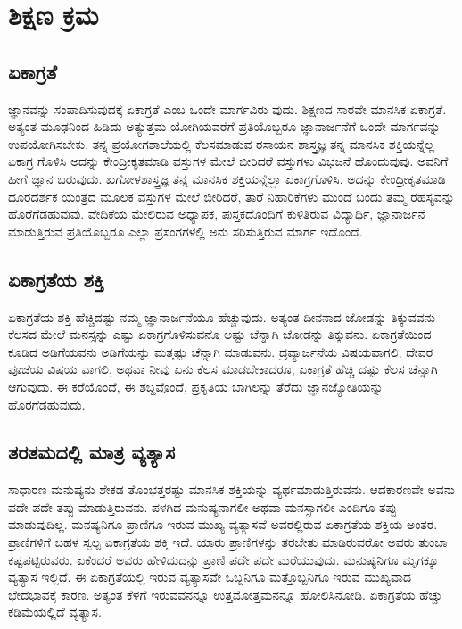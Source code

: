 
\chapter{ಶಿಕ್ಷಣ ಕ್ರಮ}

\section{ಏಕಾಗ್ರತೆ}

ಜ್ಞಾನವನ್ನು ಸಂಪಾದಿಸುವುದಕ್ಕೆ ಏಕಾಗ್ರತೆ ಎಂಬ ಒಂದೇ ಮಾರ್ಗವಿರು ವುದು. ಶಿಕ್ಷಣದ ಸಾರವೇ ಮಾನಸಿಕ ಏಕಾಗ್ರತೆ. ಅತ್ಯಂತ ಮೂಢನಿಂದ ಹಿಡಿದು ಅತ್ಯುತ್ತಮ ಯೋಗಿಯವರೆಗೆ ಪ್ರತಿಯೊಬ್ಬರೂ ಜ್ಞಾನಾರ್ಜನೆಗೆ ಒಂದೇ ಮಾರ್ಗವನ್ನು ಉಪಯೋಗಿಸಬೇಕು. ತನ್ನ ಪ್ರಯೋಗಶಾಲೆಯಲ್ಲಿ ಕೆಲಸಮಾಡುವ ರಸಾಯನ ಶಾಸ್ತ್ರಜ್ಞ ತನ್ನ ಮಾನಸಿಕ ಶಕ್ತಿಯನ್ನೆಲ್ಲ ಏಕಾಗ್ರ ಗೊಳಿಸಿ ಅದನ್ನು ಕೇಂದ್ರೀಕೃತಮಾಡಿ ವಸ್ತುಗಳ ಮೇಲೆ ಬೀರಿದರೆ ವಸ್ತುಗಳು ವಿಭಜನೆ ಹೊಂದುವುವು. ಅವನಿಗೆ ಹೀಗೆ ಜ್ಞಾನ ಬರುವುದು. ಖಗೋಳಶಾಸ್ತ್ರಜ್ಞ ತನ್ನ ಮಾನಸಿಕ ಶಕ್ತಿಯನ್ನೆಲ್ಲಾ ಏಕಾಗ್ರಗೊಳಿಸಿ, ಅದನ್ನು ಕೇಂದ್ರೀಕೃತಮಾಡಿ ದೂರದರ್ಶಕ ಯಂತ್ರದ ಮೂಲಕ ವಸ್ತುಗಳ ಮೇಲೆ ಬೀರಿದರೆ, ತಾರೆ ನಿಹಾರಿಕೆಗಳು ಮುಂದೆ ಬಂದು ತಮ್ಮ ರಹಸ್ಯವನ್ನು ಹೊರೆಗೆಡಹುವುವು. ವೇದಿಕೆಯ ಮೇಲಿರುವ ಅಧ್ಯಾಪಕ, ಪುಸ್ತಕದೊಂದಿಗೆ ಕುಳಿತಿರುವ ವಿದ್ಯಾರ್ಥಿ, ಜ್ಞಾನಾರ್ಜನೆ ಮಾಡುತ್ತಿರುವ ಪ್ರತಿಯೊಬ್ಬರೂ ಎಲ್ಲಾ ಪ್ರಸಂಗಗಳಲ್ಲಿ ಅನು ಸರಿಸುತ್ತಿರುವ ಮಾರ್ಗ ಇದೊಂದೆ.


\section{ಏಕಾಗ್ರತೆಯ ಶಕ್ತಿ}

ಏಕಾಗ್ರತೆಯ ಶಕ್ತಿ ಹೆಚ್ಚಿದಷ್ಟು ನಮ್ಮ ಜ್ಞಾನಾರ್ಜನೆಯೂ ಹೆಚ್ಚುವುದು. ಅತ್ಯಂತ ದೀನನಾದ ಜೋಡನ್ನು ತಿಕ್ಕುವವನು ಕೆಲಸದ ಮೇಲೆ ಮನಸ್ಸನ್ನು ಎಷ್ಟು ಏಕಾಗ್ರಗೊಳಿಸುವನೊ ಅಷ್ಟು ಚೆನ್ನಾಗಿ ಜೋಡನ್ನು ತಿಕ್ಕುವನು. ಏಕಾಗ್ರತೆಯಿಂದ ಕೂಡಿದ ಅಡಿಗೆಯವನು ಅಡಿಗೆಯನ್ನು ಮತ್ತಷ್ಟು ಚೆನ್ನಾಗಿ ಮಾಡುವನು. ದ್ರವ್ಯಾರ್ಜನೆಯ ವಿಷಯವಾಗಲಿ, ದೇವರ ಪೂಜೆಯ ವಿಷಯ ವಾಗಲಿ, ಅಥವಾ ನೀವು ಏನು ಕೆಲಸ ಮಾಡಬೇಕಾದರೂ, ಏಕಾಗ್ರತೆ ಹೆಚ್ಚಿ ದಷ್ಟು ಕೆಲಸ ಚೆನ್ನಾಗಿ ಆಗುವುದು. ಈ ಕರೆಯೊಂದೆ, ಈ ಶಬ್ದವೊಂದೆ, ಪ್ರಕೃತಿಯ ಬಾಗಿಲನ್ನು ತೆರೆದು ಜ್ಞಾನಜ್ಯೋತಿಯನ್ನು ಹೊರಗೆಡಹುವುದು.


\section{ತರತಮದಲ್ಲಿ ಮಾತ್ರ ವ್ಯತ್ಯಾಸ}

ಸಾಧಾರಣ ಮನುಷ್ಯನು ಶೇಕಡ ತೊಂಭತ್ತರಷ್ಟು ಮಾನಸಿಕ ಶಕ್ತಿಯನ್ನು ವ್ಯರ್ಥಮಾಡುತ್ತಿರುವನು. ಆದಕಾರಣವೇ ಅವನು ಪದೇ ಪದೇ ತಪ್ಪು ಮಾಡುತ್ತಿರುವನು. ಪಳಗಿದ ಮನುಷ್ಯನಾಗಲೀ ಅಥವಾ ಮನಸ್ಸಾಗಲೀ ಎಂದಿಗೂ ತಪ್ಪು ಮಾಡುವುದಿಲ್ಲ. ಮನಷ್ಯನಿಗೂ ಪ್ರಾಣಿಗೂ ಇರುವ ಮುಖ್ಯ ವ್ಯತ್ಯಾಸವೆ ಅವರಲ್ಲಿರುವ ಏಕಾಗ್ರತೆಯ ಶಕ್ತಿಯ ಅಂತರ. ಪ್ರಾಣಿಗಳಿಗೆ ಬಹಳ ಸ್ವಲ್ಪ ಏಕಾಗ್ರತೆಯ ಶಕ್ತಿ ಇದೆ. ಯಾರು ಪ್ರಾಣಿಗಳನ್ನು ತರಬೇತು ಮಾಡಿರುವರೋ ಅವರು ತುಂಬಾ ಕಷ್ಟಪಟ್ಟಿರುವರು. ಏಕೆಂದರೆ ಅವರು ಹೇಳಿದುದನ್ನು ಪ್ರಾಣಿ ಪದೇ ಪದೇ ಮರೆಯುವುದು. ಮನುಷ್ಯನಿಗೂ ಮೃಗಕ್ಕೂ ವ್ಯತ್ಯಾಸ ಇಲ್ಲಿದೆ. ಈ ಏಕಾಗ್ರತೆಯಲ್ಲಿ ಇರುವ ವ್ಯತ್ಯಾಸವೇ ಒಬ್ಬನಿಗೂ ಮತ್ತೊಬ್ಬನಿಗೂ ಇರುವ ಮುಖ್ಯವಾದ ಭೇದಭಾವಕ್ಕೆ ಕಾರಣ. ಅತ್ಯಂತ ಕೆಳಗೆ ಇರುವವನನ್ನೂ ಉತ್ತಮೋತ್ತಮನನ್ನೂ ಹೋಲಿಸಿನೋಡಿ. ಏಕಾಗ್ರತೆಯ ಹೆಚ್ಚು ಕಡಿಮೆಯಲ್ಲಿದೆ ವ್ಯತ್ಯಾಸ.


